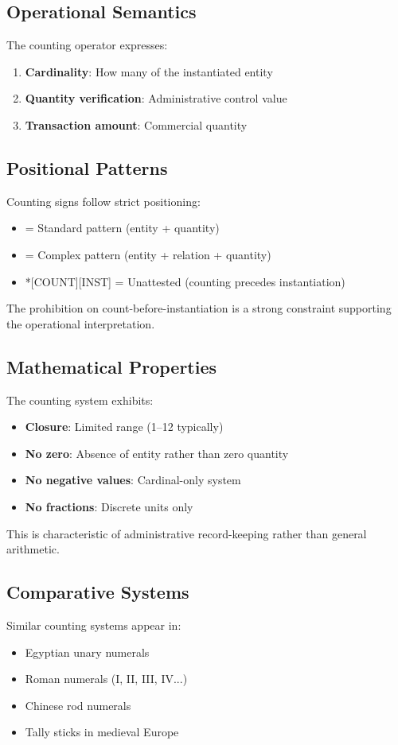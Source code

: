 \subsection{Operational Semantics}

The counting operator expresses:
\begin{enumerate}
    \item \textbf{Cardinality}: How many of the instantiated entity
    \item \textbf{Quantity verification}: Administrative control value
    \item \textbf{Transaction amount}: Commercial quantity
\end{enumerate}

\subsection{Positional Patterns}

Counting signs follow strict positioning:
\begin{itemize}
    \item [INST][COUNT] = Standard pattern (entity + quantity)
    \item [INST][REL][COUNT] = Complex pattern (entity + relation + quantity)
    \item *[COUNT][INST] = Unattested (counting precedes instantiation)
\end{itemize}

The prohibition on count-before-instantiation is a strong constraint supporting the operational interpretation.

\subsection{Mathematical Properties}

The counting system exhibits:
\begin{itemize}
    \item \textbf{Closure}: Limited range (1--12 typically)
    \item \textbf{No zero}: Absence of entity rather than zero quantity
    \item \textbf{No negative values}: Cardinal-only system
    \item \textbf{No fractions}: Discrete units only
\end{itemize}

This is characteristic of administrative record-keeping rather than general arithmetic.

\subsection{Comparative Systems}

Similar counting systems appear in:
\begin{itemize}
    \item Egyptian unary numerals
    \item Roman numerals (I, II, III, IV...)
    \item Chinese rod numerals
    \item Tally sticks in medieval Europe
\end{itemize}
